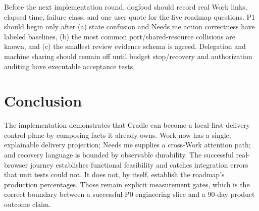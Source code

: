\documentclass[10pt,a4paper]{article}
\begin{document}
Before the next implementation round, dogfood should record real Work links,
elapsed time, failure class, and one user quote for the five roadmap questions.
P1 should begin only after (a) state confusion and Needs me action correctness
have labeled baselines, (b) the most common port/shared-resource collisions are
known, and (c) the smallest review evidence schema is agreed.  Delegation and
machine sharing should remain off until budget stop/recovery and authorization
auditing have executable acceptance tests.

\section{Conclusion}

The implementation demonstrates that Cradle can become a local-first delivery
control plane by composing facts it already owns.  Work now has a single,
explainable delivery projection; Needs me supplies a cross-Work attention path;
and recovery language is bounded by observable durability.  The successful
real-browser journey establishes functional feasibility and catches integration
errors that unit tests could not.  It does not, by itself, establish the
roadmap's production percentages.  Those remain explicit measurement gates,
which is the correct boundary between a successful P0 engineering slice and a
90-day product outcome claim.
\end{document}
